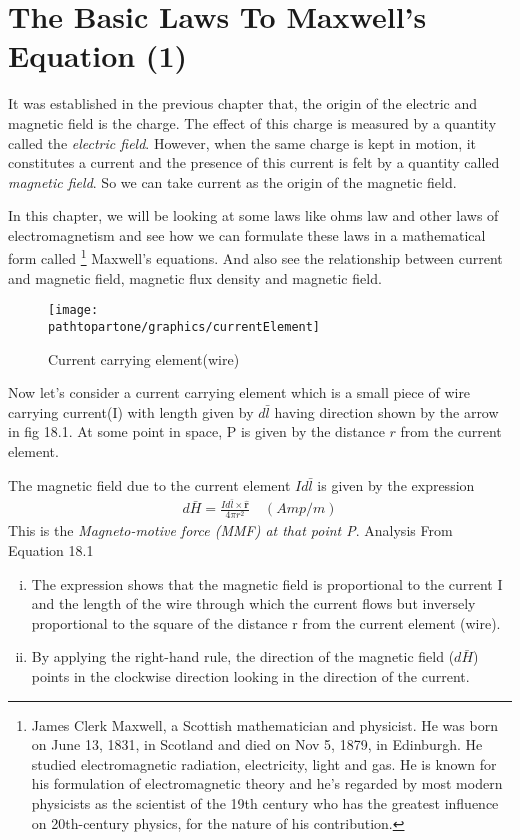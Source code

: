 \chapter{The Basic Laws To Maxwell's Equation (1)}\label{lec:lec18}
It was established in the previous chapter that, the origin of the electric and magnetic field is the charge. The effect of this charge is measured by a quantity called the \emph{electric field}. However, when the same charge is kept in motion, it constitutes a current and the presence of this current is felt by a quantity called \emph{magnetic field}. So we can take current as the origin of the magnetic field. 

In this chapter, we will be looking at some laws like ohms law and other laws of electromagnetism and see how we can formulate these laws in a mathematical form called \footnote{
James Clerk Maxwell, a Scottish mathematician and physicist. He was born on June 13, 1831, in Scotland and died on Nov 5, 1879, in Edinburgh. He studied electromagnetic radiation, electricity, light and gas. He is known for his formulation of electromagnetic theory and he's regarded by most modern physicists as the scientist of the 19th century who has the greatest influence on 20th-century physics, for the nature of his contribution.
} Maxwell's equations. And also see the relationship between current and magnetic field, magnetic flux density and magnetic field.
\begin{figure}[h]
\centering
\texttt{[image: \\pathtopartone/graphics/currentElement]}
\caption{Current carrying element(wire)}
\label{fig:currentelement}
\end{figure}

Now let's consider a current carrying element which is a small piece of wire carrying current(I) with length given by $d\bar{l}$ having direction shown by the arrow in fig 18.1. At some point in space, P is given by the distance $r$ from the current element.

The magnetic field due to the current element $Id\bar{l}$ is given by the expression
\begin{align}
\boxed{d\bar{H}= \frac{Id\bar{l} \times \hat{\textbf{r}}}{4\pi r^{2}}}\quad (Amp/m)
\end{align} 
This is the \emph{Magneto-motive force (MMF) at that point P}. Analysis From Equation 18.1
\begin{enumerate}[(i)]
\item The expression shows that the magnetic field is proportional to the current I and the length of the wire through which the current flows but inversely proportional to the square of the distance r from the current element (wire).
\item By applying the right-hand rule, the direction of the magnetic field ($d\bar{H}$) points in the clockwise direction looking in the direction of the current.
\end{enumerate}

